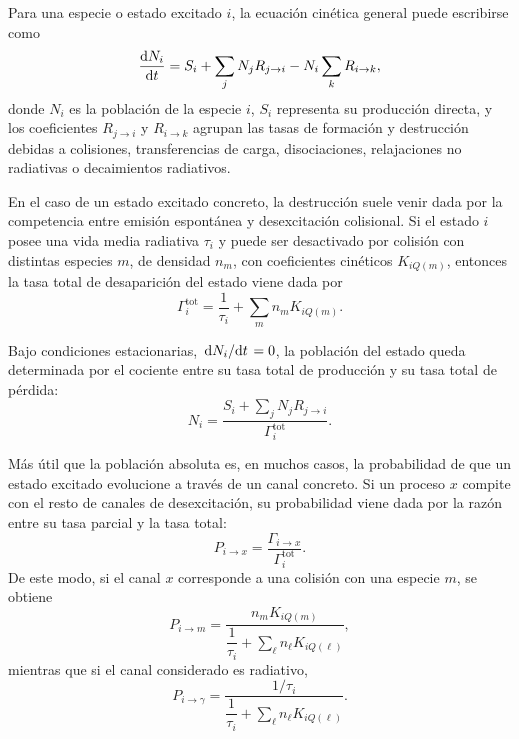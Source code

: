 \documentclass[12pt,a4paper]{article}
\begin{document}
Para una especie o estado excitado \(i\), la ecuación cinética general puede escribirse como
\begin{equation}
    \dv{N_i}{t}
    =
    S_i
    +
    \sum_j N_j R_{j\to i}
    -
    N_i \sum_k R_{i\to k},
    \label{eq:general_kinetic_balance}
\end{equation}
donde \(N_i\) es la población de la especie \(i\), \(S_i\) representa su producción directa, y los coeficientes \(R_{j\to i}\) y \(R_{i\to k}\) agrupan las tasas de formación y destrucción debidas a colisiones, transferencias de carga, disociaciones, relajaciones no radiativas o decaimientos radiativos.

En el caso de un estado excitado concreto, la destrucción suele venir dada por la competencia entre emisión espontánea y desexcitación colisional. Si el estado \(i\) posee una vida media radiativa \(\tau_i\) y puede ser desactivado por colisión con distintas especies \(m\), de densidad \(n_m\), con coeficientes cinéticos \(K_{iQ(m)}\), entonces la tasa total de desaparición del estado viene dada por
\begin{equation}
    \Gamma_i^{\text{tot}}
    =
    \frac{1}{\tau_i}
    +
    \sum_m n_m K_{iQ(m)}.
    \label{eq:total_loss_rate}
\end{equation}

Bajo condiciones estacionarias, \(\dv*{N_i}{t}=0\), la población del estado queda determinada por el cociente entre su tasa total de producción y su tasa total de pérdida:
\begin{equation}
    N_i
    =
    \frac{S_i + \sum_j N_j R_{j\to i}}
    {\Gamma_i^{\text{tot}}}.
    \label{eq:stationary_population}
\end{equation}

Más útil que la población absoluta es, en muchos casos, la probabilidad de que un estado excitado evolucione a través de un canal concreto. Si un proceso \(x\) compite con el resto de canales de desexcitación, su probabilidad viene dada por la razón entre su tasa parcial y la tasa total:
\begin{equation}
    P_{i\to x}
    =
    \frac{\Gamma_{i\to x}}
    {\Gamma_i^{\text{tot}}}.
    \label{eq:branching_ratio_general}
\end{equation}
De este modo, si el canal \(x\) corresponde a una colisión con una especie \(m\), se obtiene
\begin{equation}
    P_{i\to m}
    =
    \frac{n_m K_{iQ(m)}}
    {\dfrac{1}{\tau_i} + \sum_\ell n_\ell K_{iQ(\ell)}},
    \label{eq:branching_collision}
\end{equation}
mientras que si el canal considerado es radiativo,
\begin{equation}
    P_{i\to \gamma}
    =
    \frac{1/\tau_i}
    {\dfrac{1}{\tau_i} + \sum_\ell n_\ell K_{iQ(\ell)}}.
    \label{eq:branching_radiative}
\end{equation}
\end{document}
